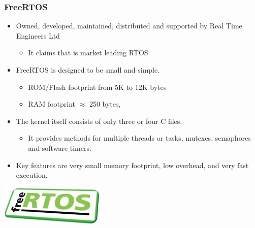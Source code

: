 \documentclass{beamer}
\begin{document}
\begin{frame}
	\frametitle{FreeRTOS}
	\begin{itemize}
		\justifying
		\item Owned, developed, maintained, distributed and supported by Real Time Engineers Ltd
			\begin{itemize}
				\item It claims that is market leading RTOS
			\end{itemize}
		\item FreeRTOS is designed to be \textcolor{TextOrange}{small}
		and \textcolor{TextOrange}{simple}.
		\begin{itemize}
			\item ROM/Flash footprint from 5K to 12K bytes
			\item RAM footprint $\approx$ 250 bytes,
		\end{itemize}
		\item The kernel itself consists of only three or four C files.
		\begin{itemize}
			\item It provides methods for multiple threads or tasks, mutexes, semaphores and software timers.		
		\end{itemize}
		\item Key features are \textcolor{TextGreen}{very small memory footprint},
		\textcolor{TextGreen}{low overhead}, and \textcolor{TextGreen}{very fast execution}.
	\end{itemize}

	\vspace{.5cm}
	\hspace*{5.5cm} \includegraphics[width=5cm]{figs/freertos-logo.jpg}	
\end{frame}
\end{document}

